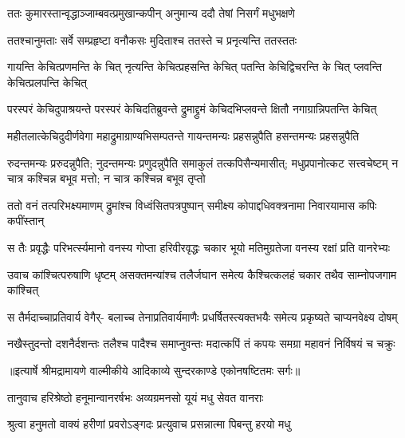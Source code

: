 \twolineshloka
{ततः कुमारस्तान्वृद्धाञ्जाम्बवत्प्रमुखान्कपीन्}
{अनुमान्य ददौ तेषां निसर्गं मधुभक्षणे} %

\twolineshloka
{ततश्चानुमताः सर्वे सम्प्रहृष्टा वनौकसः}
{मुदिताश्च ततस्ते च प्रनृत्यन्ति ततस्ततः} %

\fourlineindentedshloka
{गायन्ति केचित्प्रणमन्ति के चित्}
{नृत्यन्ति केचित्प्रहसन्ति केचित्}
{पतन्ति केचिद्विचरन्ति के चित्}
{प्लवन्ति केचित्प्रलपन्ति केचित्} %

\fourlineindentedshloka
{परस्परं केचिदुपाश्रयन्ते}
{परस्परं केचिदतिब्रुवन्ते}
{द्रुमाद्द्रुमं केचिदभिप्लवन्ते}
{क्षितौ नगाग्रान्निपतन्ति केचित्} %

\fourlineindentedshloka
{महीतलात्केचिदुदीर्णवेगा}
{महाद्रुमाग्राण्यभिसम्पतन्ते}
{गायन्तमन्यः प्रहसन्नुपैति}
{हसन्तमन्यः प्रहसन्नुपैति} %

\threelineshloka
{रुदन्तमन्यः प्ररुदन्नुपैति; नुदन्तमन्यः प्रणुदन्नुपैति}
{समाकुलं तत्कपिसैन्यमासीत्; मधुप्रपानोत्कट सत्त्वचेष्टम्}
{न चात्र कश्चिन्न बभूव मत्तो; न चात्र कश्चिन्न बभूव तृप्तो} %

\fourlineindentedshloka
{ततो वनं तत्परिभक्ष्यमाणम्}
{द्रुमांश्च विध्वंसितपत्रपुष्पान्}
{समीक्ष्य कोपाद्दधिवक्त्रनामा}
{निवारयामास कपिः कपींस्तान्} %

\fourlineindentedshloka
{स तैः प्रवृद्धैः परिभर्त्स्यमानो}
{वनस्य गोप्ता हरिवीरवृद्धः}
{चकार भूयो मतिमुग्रतेजा}
{वनस्य रक्षां प्रति वानरेभ्यः} %

\fourlineindentedshloka
{उवाच कांश्चित्परुषाणि धृष्टम्}
{असक्तमन्यांश्च तलैर्जघान}
{समेत्य कैश्चित्कलहं चकार}
{तथैव साम्नोपजगाम कांश्चित्} %

\fourlineindentedshloka
{स तैर्मदाच्चाप्रतिवार्य वेगैर्-}
{बलाच्च तेनाप्रतिवार्यमाणैः}
{प्रधर्षितस्त्यक्तभयैः समेत्य}
{प्रकृष्यते चाप्यनवेक्ष्य दोषम्} %

\fourlineindentedshloka
{नखैस्तुदन्तो दशनैर्दशन्तः}
{तलैश्च पादैश्च समाप्नुवन्तः}
{मदात्कपिं तं कपयः समग्रा}
{महावनं निर्विषयं च चक्रुः} %


{॥इत्यार्षे श्रीमद्रामायणे वाल्मीकीये आदिकाव्ये सुन्दरकाण्डे एकोनषष्टितमः सर्गः॥}


\twolineshloka
{तानुवाच हरिश्रेष्ठो हनूमान्वानरर्षभः}
{अव्यग्रमनसो यूयं मधु सेवत वानराः} %

\twolineshloka
{श्रुत्वा हनुमतो वाक्यं हरीणां प्रवरोऽङ्गदः}
{प्रत्युवाच प्रसन्नात्मा पिबन्तु हरयो मधु} %

